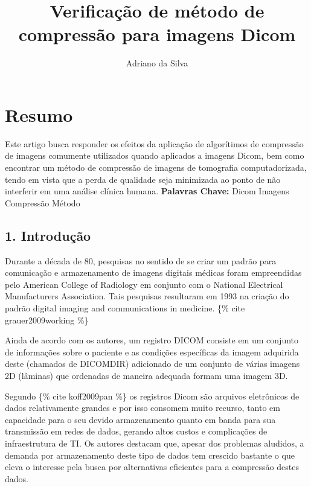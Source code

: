 \documentclass[11pt]{article}
\title{Verificação de método de compressão para imagens Dicom}
\author{Adriano da Silva}
\begin{document}
    
    
    \maketitle
    
    

    
    \section{Resumo}\label{resumo}

    Este artigo busca responder os efeitos da aplicação de algorítimos de
compressão de imagens comumente utilizados quando aplicados a imagens
Dicom, bem como encontrar um método de compressão de imagens de
tomografia computadorizada, tendo em vista que a perda de qualidade seja
minimizada ao ponto de não interferir em uma análise clínica humana.
\textbf{Palavras Chave:} Dicom Imagens Compressão Método

    \subsection{1. Introdução}\label{introduuxe7uxe3o}

    Durante a década de 80, pesquisas no sentido de se criar um padrão para
comunicação e armazenamento de imagens digitais médicas foram
empreendidas pelo American College of Radiology em conjunto com o
National Electrical Manufacturers Association. Tais pesquisas resultaram
em 1993 na criação do padrão digital imaging and communications in
medicine. \{\% cite grauer2009working \%\}

Ainda de acordo com os autores, um registro DICOM consiste em um
conjunto de informações sobre o paciente e as condições específicas da
imagem adquirida deste (chamados de DICOMDIR) adicionado de um conjunto
de várias imagens 2D (lâminas) que ordenadas de maneira adequada formam
uma imagem 3D.

Segundo \{\% cite koff2009pan \%\} os registros Dicom são arquivos
eletrônicos de dados relativamente grandes e por isso consomem muito
recurso, tanto em capacidade para o seu devido armazenamento quanto em
banda para sua transmissão em redes de dados, gerando altos custos e
complicações de infraestrutura de TI. Os autores destacam que, apesar
dos problemas aludidos, a demanda por armazenamento deste tipo de dados
tem crescido bastante o que eleva o interesse pela busca por
alternativas eficientes para a compressão destes dados.
\end{document}
